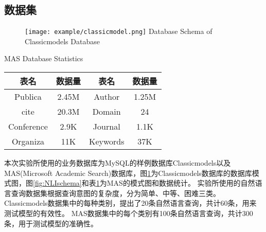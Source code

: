 \subsection{数据集}

\begin{figure}[!htp]
    \centering
    \texttt{[image: example/classicmodel.png]}
      {Database Schema of Classicmodels Database}
    \label{fig:NLIclassicmodel}
  \end{figure}

  \begin{table}[!hpb]
    \centering
      {MAS Database Statistics}
    \label{nli:MASsjksjtj}
    \begin{tabular}{|c|c|c|c|} 
      \hline
      表名 & 数据量 & 表名 & 数据量\\
      \hline
      Publica & 2.45M & Author & 1.25M\\
      \hline
      cite & 20.3M & Domain & 24\\
      \hline
      Conference & 2.9K & Journal & 1.1K\\
      \hline
      Organiza & 11K & Keywords & 37K\\
      \hline
    \end{tabular}
  \end{table}


本次实验所使用的业务数据库为MySQL的样例数据库Classicmodels以及MAS(Microsoft Academic Search)数据库，图\ref{fig:NLIclassicmodel}为Classicmodels数据库的数据库模式图，图\ref{fig:NLIschema}和表\ref{nli:MASsjksjtj}为MAS的模式图和数据统计。
实验所使用的自然语言查询数据集根据查询意图的复杂度，分为简单、中等、困难三类。
Classicmodels数据集中的每种类别，提出了20条自然语言查询，共计60条，用来测试模型的有效性。
MAS数据集中的每个类别有100条自然语言查询，共计300条，用于测试模型的准确性。


